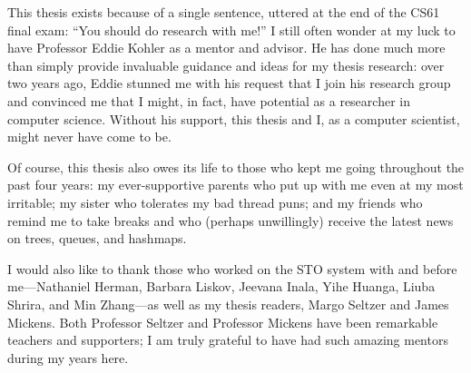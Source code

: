 This thesis exists because of a single sentence, uttered at the end of the CS61 final exam: ``You should do research with me!'' I still often wonder at my luck to have Professor Eddie Kohler as a mentor and advisor. He has done much more than simply provide invaluable guidance and ideas for my thesis research: over two years ago, Eddie stunned me with his request that I join his research group and convinced me that I might, in fact, have potential as a researcher in computer science. Without his support, this thesis and I, as a computer scientist, might never have come to be.

    Of course, this thesis also owes its life to those who kept me going throughout the past four years: my ever-supportive parents who put up with me even at my most irritable; my sister who tolerates my bad thread puns; and my friends who remind me to take breaks and who (perhaps unwillingly) receive the latest news on trees, queues, and hashmaps.

        I would also like to thank those who worked on the STO system with and before me---Nathaniel Herman, Barbara Liskov, Jeevana Inala, Yihe Huanga, Liuba Shrira, and Min Zhang---as well as my thesis readers, Margo Seltzer and James Mickens. Both Professor Seltzer and Professor Mickens have been remarkable teachers and supporters; I am truly grateful to have had such amazing mentors during my years here.
